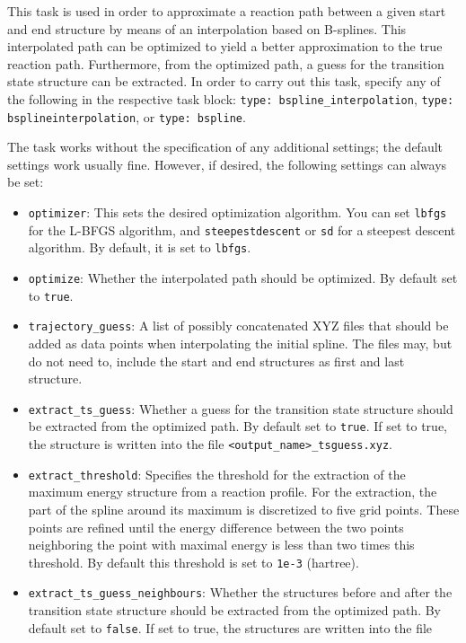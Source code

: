 \documentclass[]{tufte-book}
\begin{document}
This task is used in order to approximate a reaction path between a given start and end structure by means of an
interpolation based on B-splines\cite{bsplines}. This interpolated path can be optimized to yield a better approximation
to the true reaction path. Furthermore, from the optimized path, a guess for the transition state structure can be
extracted. In order to carry out this task, specify any of the following in the respective task block: \texttt{type: bspline\_interpolation},
\texttt{type: bsplineinterpolation}, or \texttt{type: bspline}.

The task works without the specification of any additional settings; the default settings work usually fine. However,
if desired, the following settings can always be set:
\begin{itemize}
\item \texttt{optimizer}: This sets the desired optimization algorithm. You can set \texttt{lbfgs} for the L-BFGS algorithm, and
\texttt{steepestdescent} or \texttt{sd} for a steepest descent algorithm. By default, it is set to \texttt{lbfgs}.
\item \texttt{optimize}: Whether the interpolated path should be optimized. By default set to \texttt{true}.
\item \texttt{trajectory\_guess}: A list of possibly concatenated XYZ files that should be added as data points when interpolating
the initial spline. The files may, but do not need to, include the start and end structures as first and last structure.
\item \texttt{extract\_ts\_guess}:  Whether a guess for the transition state structure should be extracted from the optimized
path. By default set to \texttt{true}. If set to true, the structure is written into the file \texttt{<output\_name>\_tsguess.xyz}.
\item \texttt{extract\_threshold}: Specifies the threshold for the extraction of the maximum energy structure from a
reaction profile. For the extraction, the part of the spline around its maximum is discretized to five grid points. These
points are refined until the energy difference between the two points neighboring the point with maximal energy is less
than two times this threshold. By default this threshold is set to \texttt{1e-3} (hartree).
\item \texttt{extract\_ts\_guess\_neighbours}: Whether the structures before and after the transition state structure should be
extracted from the optimized path. By default set to \texttt{false}. If set to true, the structures are written into the file

\end{itemize}
\end{document}
